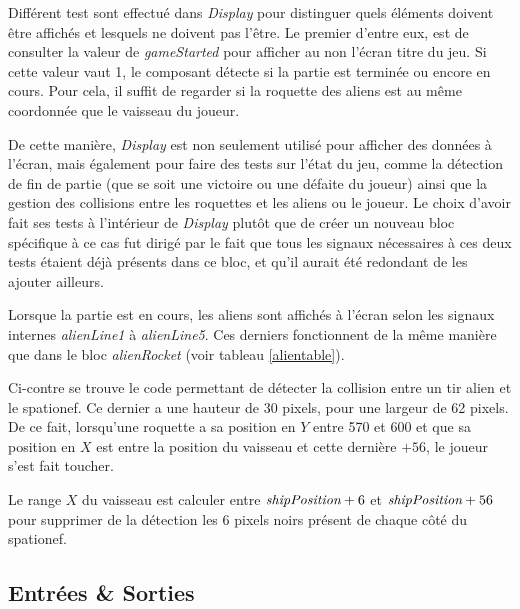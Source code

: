 \documentclass[french]{nakrule}
\begin{document}
Différent test sont effectué dans \emph{Display} pour distinguer quels éléments
doivent être affichés et lesquels ne doivent pas l'être. Le premier d'entre eux,
est de consulter la valeur de \emph{gameStarted} pour afficher au non l'écran
titre du jeu. Si cette valeur vaut 1, le composant détecte si la partie est
terminée ou encore en cours. Pour cela, il suffit de regarder si la roquette des
aliens est au même coordonnée que le vaisseau du joueur.

De cette manière, \emph{Display} est non seulement utilisé pour afficher des
données à l'écran, mais également pour faire des tests sur l'état du jeu, comme
la détection de fin de partie (que se soit une victoire ou une défaite du
joueur) ainsi que la gestion des collisions entre les roquettes et les aliens ou
le joueur. Le choix d'avoir fait ses tests à l'intérieur de \emph{Display} plutôt
que de créer un nouveau bloc spécifique à ce cas fut dirigé par le fait que
tous les signaux nécessaires à ces deux tests étaient déjà présents dans ce
bloc, et qu'il aurait été redondant de les ajouter ailleurs.

\begin{figure}

\end{figure}

Lorsque la partie est en cours, les aliens sont affichés à l'écran selon les
signaux internes \emph{alienLine1} à \emph{alienLine5}. Ces derniers
fonctionnent de la même manière que dans le bloc \emph{alienRocket} (voir
tableau \ref{alientable}).

Ci-contre se trouve le code permettant de détecter la collision entre un tir
alien et le spationef. Ce dernier a une hauteur de 30 pixels, pour une largeur
de 62 pixels. De ce fait, lorsqu'une roquette a sa position en $Y$ entre 570
et 600 et que sa position en $X$ est entre la position du vaisseau et cette
dernière $+ 56$, le joueur s'est fait toucher.

Le range $X$ du vaisseau est calculer entre $\emph{shipPosition}+6$ et
$\emph{shipPosition}+56$ pour supprimer de la détection les 6 pixels noirs
présent de chaque côté du spationef.


\clearpage

\subsection{Entrées \& Sorties}
\label{subsec:Entrees_Sorties_display}
\end{document}
